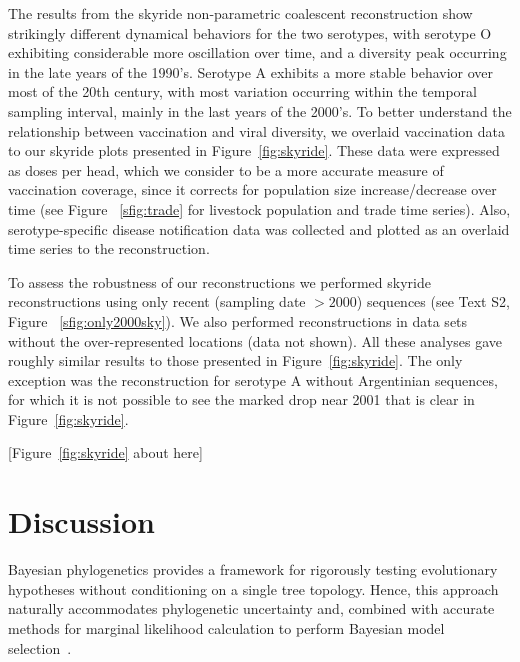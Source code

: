 \documentclass[10pt]{article}
\begin{document}
The results from the skyride non-parametric coalescent reconstruction show strikingly different dynamical behaviors for the two serotypes, with serotype O exhibiting considerable more oscillation over time, and a diversity peak occurring in the late years of the 1990's.
Serotype A exhibits a more stable behavior over most of the 20th century, with most variation occurring within the temporal sampling interval, mainly in the last years of the 2000's.
To better understand the relationship between vaccination and viral diversity, we overlaid vaccination data to our skyride plots presented in Figure~\ref{fig:skyride}.
These data were expressed as doses per head, which we consider to be a more accurate measure of vaccination coverage, since it corrects for population size increase/decrease over time (see Figure ~\ref{sfig:trade} for livestock population and trade time series). 
Also, serotype-specific disease notification data was collected and plotted as an overlaid time series to the reconstruction. 

To assess the robustness of our reconstructions we performed skyride reconstructions using only recent (sampling date $>2000$) sequences (see Text S2, Figure ~\ref{sfig:only2000sky}).
We also performed reconstructions in data sets without the over-represented locations (data not shown). All these analyses gave roughly similar results to those presented in Figure~\ref{fig:skyride}. The only exception was the reconstruction for serotype A without Argentinian sequences, for which it is not possible to see the marked drop near 2001 that is clear in Figure~\ref{fig:skyride}. 

\begin{center}
 [Figure~\ref{fig:skyride} about here]
\end{center}

\section*{Discussion}
Bayesian phylogenetics provides a framework for rigorously testing evolutionary hypotheses without conditioning on a single tree topology. Hence, this approach naturally accommodates phylogenetic uncertainty and, combined with accurate methods for marginal likelihood calculation to perform Bayesian model selection~\cite{Baele2012,Baele2013a,Baele2013b}.
\end{document}
